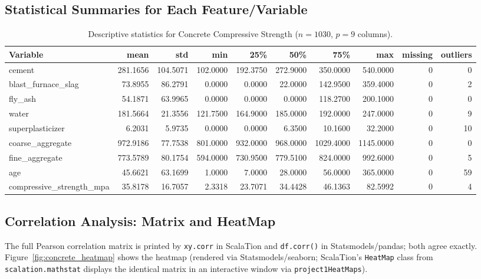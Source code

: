\documentclass{article}
\begin{document}
\subsection{Statistical Summaries for Each Feature/Variable}
\begin{table}[H]
\centering
\small
\begin{tabular}{lrrrrrrrrr}
\toprule
Variable & mean & std & min & 25\% & 50\% & 75\% & max & missing & outliers \\
\midrule
cement & 281.1656 & 104.5071 & 102.0000 & 192.3750 & 272.9000 & 350.0000 & 540.0000 & 0 & 0 \\
blast\_furnace\_slag & 73.8955 & 86.2791 & 0.0000 & 0.0000 & 22.0000 & 142.9500 & 359.4000 & 0 & 2 \\
fly\_ash & 54.1871 & 63.9965 & 0.0000 & 0.0000 & 0.0000 & 118.2700 & 200.1000 & 0 & 0 \\
water & 181.5664 & 21.3556 & 121.7500 & 164.9000 & 185.0000 & 192.0000 & 247.0000 & 0 & 9 \\
superplasticizer & 6.2031 & 5.9735 & 0.0000 & 0.0000 & 6.3500 & 10.1600 & 32.2000 & 0 & 10 \\
coarse\_aggregate & 972.9186 & 77.7538 & 801.0000 & 932.0000 & 968.0000 & 1029.4000 & 1145.0000 & 0 & 0 \\
fine\_aggregate & 773.5789 & 80.1754 & 594.0000 & 730.9500 & 779.5100 & 824.0000 & 992.6000 & 0 & 5 \\
age & 45.6621 & 63.1699 & 1.0000 & 7.0000 & 28.0000 & 56.0000 & 365.0000 & 0 & 59 \\
compressive\_strength\_mpa & 35.8178 & 16.7057 & 2.3318 & 23.7071 & 34.4428 & 46.1363 & 82.5992 & 0 & 4 \\
\bottomrule
\end{tabular}
\caption{Descriptive statistics for Concrete Compressive Strength ($n=1030$, $p=9$ columns).}
\end{table}

\subsection{Correlation Analysis: Matrix and HeatMap}
The full Pearson correlation matrix is printed by \texttt{xy.corr} in ScalaTion and \texttt{df.corr()} in Statsmodels/pandas; both agree exactly. Figure~\ref{fig:concrete_heatmap} shows the heatmap (rendered via Statsmodels/seaborn; ScalaTion's \texttt{HeatMap} class from \texttt{scalation.mathstat} displays the identical matrix in an interactive window via \texttt{project1HeatMaps}).
\end{document}
